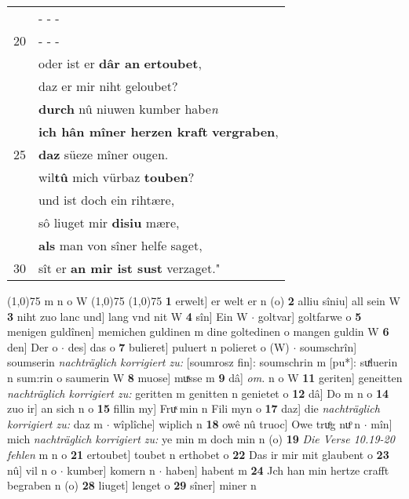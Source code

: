 \documentclass[8pt,a4paper,notitlepage]{article}
\begin{document}
\begin{table}[ht]
\begin{minipage}[t]{0.5\linewidth}
\begin{tabular}{rl}
 & \multicolumn{1}{l}{ - - - }\\ 
20 & \multicolumn{1}{l}{ - - - }\\ 
 & oder ist er \textbf{dâr an} \textbf{ertoubet},\\ 
 & daz er mir niht geloubet?\\ 
 & \textbf{durch} nû niuwen kumber habe\textit{n}\\ 
 & \textbf{ich hân mîner herzen kraft} \textbf{vergraben},\\ 
25 & \textbf{daz} süeze mîner ougen.\\ 
 & wil\textbf{tû} mich vürbaz \textbf{touben}?\\ 
 & und ist doch ein rihtære,\\ 
 & sô liuget mir \textbf{disiu} mære,\\ 
 & \textbf{als} man von sîner helfe saget,\\ 
30 & sît er \textbf{an mir ist sust} verzaget."\\ 
\end{tabular}
\scriptsize
\line(1,0){75} \newline
m n o W \newline
\line(1,0){75} \newline
\newline
\line(1,0){75} \newline
\textbf{1} erwelt] er welt er n (o) \textbf{2} alliu sîniu] all sein W \textbf{3} niht zuo lanc und] lang vnd nit W \textbf{4} sîn] Ein W  $\cdot$ goltvar] goltfarwe o \textbf{5} menigen guldînen] memichen guldinen m dine goltedinen o mangen guldin W \textbf{6} den] Der o  $\cdot$ des] das o \textbf{7} bulieret] puluert n polieret o (W)  $\cdot$ soumschrîn] soumserin \textit{nachträglich korrigiert zu:} [soumrosz fin]: soumschrin m [pu*]: suͯluerin n sum:rin o saumerin W \textbf{8} muose] muͯsse m \textbf{9} dâ] \textit{om.} n o W \textbf{11} geriten] geneitten \textit{nachträglich korrigiert zu:} geritten m genitten n genietet o \textbf{12} dâ] Do m n o \textbf{14} zuo ir] an sich n o \textbf{15} fillin my] Fruͯ min n Fili myn o \textbf{17} daz] die \textit{nachträglich korrigiert zu:} daz m  $\cdot$ wîplîche] wiplich n \textbf{18} owê nû truoc] Owe truͦg nuͦ n  $\cdot$ mîn] mich \textit{nachträglich korrigiert zu:} ye min m doch min n (o) \textbf{19} \textit{Die Verse 10.19-20 fehlen} m n o  \textbf{21} ertoubet] toubet n erthobet o \textbf{22} Das ir mir mit glaubent o \textbf{23} nû] vil n o  $\cdot$ kumber] komern n  $\cdot$ haben] habent m \textbf{24} Jch han min hertze crafft begraben n (o) \textbf{28} liuget] lenget o \textbf{29} sîner] miner n \newline
\end{minipage}
\end{table}
\end{document}
